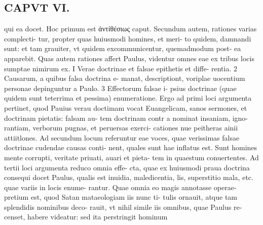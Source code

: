 \documentclass{article}
\begin{document}
\begin{pages}
\section*{CAPVT  VI. }
\marginpar{[ p.425 ]}\pstart qui ea docet. Hoc primum est ἀντίθέσιως caput. Secundum autem, rationes varias complecti- tur, propter quas huiusmodi homines, et meri- to quidem, damnandi sunt: et tam grauiter, vt quidem excommunicentur, quemadmodum post- ea apparebit. Quas autem rationes affert Paulus, videntur omnes eae ex tribus locis sumptae nimirum ex. I Verae doctrinae et falsae epithetis et diffe- rentia. 2 Causarum, a quibus falsa doctrina e- manat, descriptiont, voriplae uocentium personae depinguntur a Paulo. 3 Effectorum falsae i- psius doctrinae (quae quidem sunt teterrima et pessima) enumeratione.  \pend\pstart Ergo ad primi loci argumenta pertinet, quod Pauius verau doctimam vocat Euangelicam, sanos sermones, et doctrinam pietatis: falsam au- tem doctrinam contr a nominat insaniam, igno- rantiam, verborum pugnas, et peruersas exerci- cationes nue peitheras ainii attiitlones.  \pend\pstart Ad secundum locum referuntur eae voces, quae verissimas falsae doctrinae cudendae causas conti- nent, quales sunt hae inflatus est. Sunt homines mente corrupti, veritate priuati, auari et pieta- tem in quaestum conuertentes.  \pend\pstart Ad tertii loci argumenta reduco omnia effe- cta, quae ex huiusmodi praua doctrina consequi docet Paulus, qualis est inuidia, maledicentia, lis, superstitio mala, etc. quae variis in locis enume- rantur. Quae omnia eo magis annotasse operae- pretium est, quod Satan mataeologiam iis nunc ti- tulis ornauit, atque  tam splendidis nominibus deco- rauit, vt nihil simile iis omnibus, quae Paulus re- censet, habere videatur: sed ita perstringit hominum  \pend

\end{pages}
\end{document}
